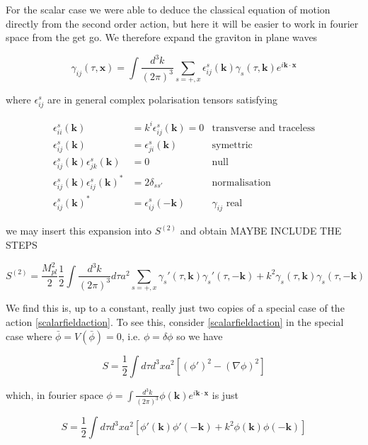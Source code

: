 \documentclass[a4paper,11pt]{article}
\renewcommand{\v}[1]{\mathbf{#1}}
\newcommand{\Mp}{M_{pl}}
\newcommand{\half}{\frac{1}{2}}
\newcommand{\bphi}{\bar{\phi}}
\newcommand{\fint}[1]{\int \frac{d^3 #1}{(2\pi)^3}}
\begin{document}
For the scalar case we were able to deduce the classical equation of motion directly from the second order action, but here it will be easier to work in fourier space from the get go. We therefore expand the graviton in plane waves

\begin{equation}
\gamma_{ij}(\tau, \v{x}) = \fint{k} \sum_{s=+,x} \epsilon_{ij}^s(\v{k})\gamma_s(\tau,\v{k})e^{i\v{k}\cdot\v{x}}
\end{equation}

where $\epsilon_{ij}^s$ are in general complex polarisation tensors satisfying


\begin{align}
\epsilon_{ii}^s(\v{k}) &= k^i \epsilon_{ij}^s(\v{k}) = 0 &\text{transverse and traceless}\\
\epsilon_{ij}^s(\v{k}) &= \epsilon_{ji}^s(\v{k}) &\text{symettric}\\
\epsilon_{ij}^s(\v{k})\epsilon_{jk}^s(\v{k}) &= 0&\text{null}\\
\epsilon_{ij}^s(\v{k})\epsilon_{ij}^s(\v{k})^* &= 2\delta_{ss'} &\text{normalisation}\\
\epsilon_{ij}^s(\v{k})^* &= \epsilon_{ij}^s(\v{-k})&\text{$\gamma_{ij}$ real}
\end{align}

we may insert this expansion into $S^{(2)}$ and obtain MAYBE INCLUDE THE STEPS

\begin{equation}
S^{(2)} = \frac{\Mp^2}{2} \half \fint{k} d\tau a^2 \sum_{s=+,x} \gamma_s'(\tau,\v{k})\gamma_s '(\tau,\v{-k})+k^2 \gamma_s(\tau,\v{k})\gamma_s (\tau,\v{-k})
\label{gravwaveaction}
\end{equation}

We find this is, up to a constant, really just two copies of a special case of the action \ref{scalarfieldaction}. To see this, consider \ref{scalarfieldaction} in the special case where $\bphi = V(\bphi) = 0$, i.e. $\phi = \delta \phi$ so we have 


\begin{equation}
S = \half \int d\tau d^3x a^2 [(\phi ' )^2 -(\nabla \phi)^2]
\end{equation}

which, in fourier space $\phi = \fint{k} \phi(\v{k})e^{i\v{k}\cdot\v{x}}$ is just

\begin{equation}
S = \half \int d\tau d^3x a^2 [\phi'(\v{k})\phi'(\v{-k}) + k^2 \phi(\v{k})\phi(\v{-k})]
\end{equation}
\end{document}
